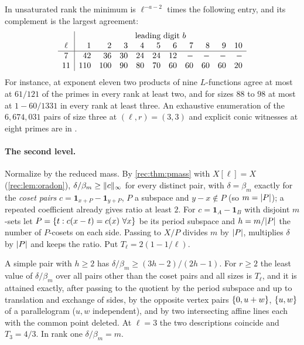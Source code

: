 In unsaturated rank the minimum is $\ell^{-a-2}$ times the following entry, and its complement is the largest
agreement:
\[
\begin{array}{c|rrrrrrrrrr}
 & \multicolumn{10}{c}{\text{leading digit }b}\\
 \ell &1&2&3&4&5&6&7&8&9&10\\\hline
 7&42&36&30&24&24&12&-&-&-&-\\
 11&110&100&90&80&70&60&60&60&60&20
\end{array}
\]
For instance, at exponent eleven two products of nine $L$-functions agree at most at $61/121$ of the primes in
every rank at least two, and for sizes $88$ to $98$ at most at $1-60/1331$ in every rank at least three. An
exhaustive enumeration of the $6{,}674{,}031$ pairs of size three at $(\ell,r)=(3,3)$ and explicit conic witnesses at
eight primes are in .

\paragraph{The second level.}
Normalize by the reduced mass. By \cref{rec:thm:pmass} with $X[\ell]=X$ (\cref{rec:lem:oradon}), $\delta/\beta_m\ge\lVert c\rVert_\infty$ for every
distinct pair, with $\delta=\beta_m$ exactly for the \emph{coset pairs} $c=\mathbf 1_{x+P}-\mathbf 1_{y+P}$, $P$ a subspace and $y-x\notin P$ (so
$m=\lvert P\rvert$); a repeated coefficient already gives ratio at least $2$. For $c=\mathbf 1_A-\mathbf 1_B$ with disjoint $m$-sets let $P=\{t:c(x-t)=c(x)\ \forall x\}$ be its period subspace and
$h=m/\lvert P\rvert$ the number of $P$-cosets on each side. Passing to $X/P$ divides $m$ by $\lvert P\rvert$, multiplies $\delta$ by $\lvert P\rvert$ and
keeps the ratio. Put $T_\ell=2(1-1/\ell)$.

\begin{theorem}\label{rec:thm:olevel}
A simple pair with $h\ge2$ has $\delta/\beta_m\ge(3h-2)/(2h-1)$. For $r\ge2$ the least value of $\delta/\beta_m$ over
all pairs other than the coset pairs and all sizes is $T_\ell$, and it is attained exactly, after passing to the quotient by the period
subspace and up to translation and exchange of sides, by the opposite vertex pairs $\{0,u+w\}$, $\{u,w\}$ of a
parallelogram ($u,w$ independent), and by two intersecting affine lines each with the common point deleted.
At $\ell=3$ the two descriptions coincide and $T_3=4/3$. In rank one $\delta/\beta_m=m$.
\end{theorem}

